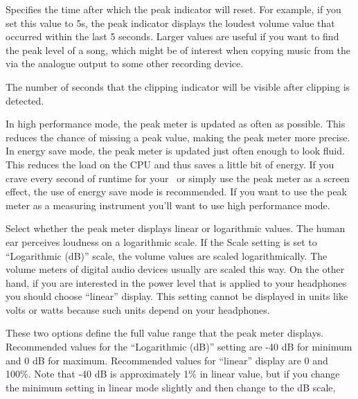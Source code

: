 \begin{description}
{\begin{description}
        Specifies the time after which the peak indicator will reset.  
        For example, if you set this value to 5s, the peak indicator displays 
        the loudest volume value that occurred within the last 5 seconds.  
        Larger values are useful if you want to find the peak level of a song, 
        which might be of interest when copying music from the \dap via the 
        analogue output to some other recording device.
      \item[Clip Hold Time:]
        The number of seconds that the clipping indicator will be visible 
        after clipping is detected.
      \item[Performance:]
        In high performance mode, the peak meter is updated as often as 
        possible. This reduces the chance of missing a peak value, making 
        the peak meter more precise. In energy save mode, the peak meter is 
        updated just often enough to look fluid.  This reduces the load on 
        the CPU and thus saves a little bit of energy.  If you crave every 
        second of runtime for your \dap\ or simply use the peak meter as a 
        screen effect, the use of energy save mode is recommended.  If you 
        want to use the peak meter as a measuring instrument you'll want to 
        use high performance mode.  
      \item[Scale:]
        Select whether the peak meter displays linear or logarithmic values. 
        The human ear perceives loudness on a logarithmic scale.  If the 
        Scale setting is set to ``Logarithmic (dB)'' scale, the volume values 
        are scaled logarithmically.  The volume meters of digital audio 
        devices usually are scaled this way.  On the other hand, if you 
        are interested in the power level that is applied to your headphones 
        you should choose ``linear'' display.  This setting cannot be 
        displayed in units like volts or watts because such units depend 
        on your headphones.
      \item[Minimum and maximum range:]
        These two options define the full value range that the peak meter 
        displays. Recommended values for the ``Logarithmic (dB)'' setting 
        are {}-40 dB for minimum and 0 dB for maximum. Recommended values 
        for ``linear'' display are 0 and 100\%. Note that {}-40 dB is 
        approximately 1\% in linear value, but if you change the minimum 
        setting in linear mode slightly and then change to the dB scale, 

\end{description}}
\end{description}

